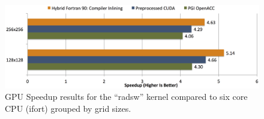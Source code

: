 \begin{figure}[htpb]
        \centering
        \includegraphics[width=14cm]{figures/verificationSpeedupVS6Core}
        \caption[GPU Speedup Results of Sample Implementation Compared to Six Core]{GPU Speedup results for the ``radsw'' kernel compared to six core CPU (ifort) grouped by grid sizes.}
        \label{figure:verificationSpeedupVS6Core}
\end{figure}

% 

